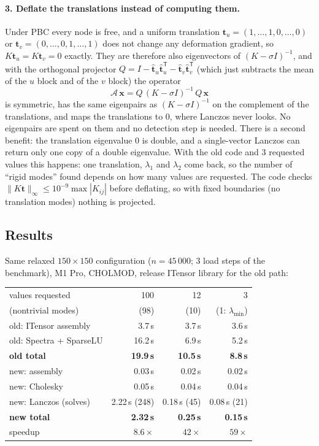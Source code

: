 \documentclass[11pt,a4paper]{article}
\theoremstyle{remark}
\newcommand{\T}{^{\mathsf T}}
\begin{document}
\paragraph{3. Deflate the translations instead of computing them.} Under PBC every node is free,
and a uniform translation $\bm t_u=(1,\dots,1,0,\dots,0)$ or $\bm t_v=(0,\dots,0,1,\dots,1)$ does
not change any deformation gradient, so $K\bm t_u=K\bm t_v=0$ exactly. They are therefore also
eigenvectors of $(K-\sigma I)^{-1}$, and with the orthogonal projector
$Q=I-\hat{\bm t}_u\hat{\bm t}_u\T-\hat{\bm t}_v\hat{\bm t}_v\T$ (which just subtracts the mean of
the $u$ block and of the $v$ block) the operator
\begin{equation}
\mathcal{A}\,\bm x = Q\,(K-\sigma I)^{-1}\,Q\,\bm x
\end{equation}
is symmetric, has the same eigenpairs as $(K-\sigma I)^{-1}$ on the complement of the
translations, and maps the translations to $0$, where Lanczos never looks. No eigenpairs are
spent on them and no detection step is needed. There is a second benefit: the translation
eigenvalue $0$ is double, and a single-vector Lanczos can return only one copy of a double
eigenvalue. With the old code and 3 requested values this happens: one translation, $\lambda_1$
and $\lambda_2$ come back, so the number of ``rigid modes'' found depends on how many values are
requested. The code checks $\|K\bm t\|_\infty\le10^{-9}\max|K_{ij}|$
before deflating, so with fixed boundaries (no translation modes) nothing is projected.

\subsection{Results}

Same relaxed $150\times150$ configuration ($n=45\,000$; 3 load steps of the benchmark), M1 Pro,
CHOLMOD, release ITensor library for the old path:

\begin{center}
\begin{tabular}{lrrr}
\toprule
values requested & 100 & 12 & 3\\
(nontrivial modes) & (98) & (10) & (1: $\lambda_{\min}$)\\
\midrule
old: ITensor assembly & 3.7\,s & 3.7\,s & 3.6\,s\\
old: Spectra + SparseLU & 16.2\,s & 6.9\,s & 5.2\,s\\
\textbf{old total} & \textbf{19.9\,s} & \textbf{10.5\,s} & \textbf{8.8\,s}\\
\midrule
new: assembly & 0.03\,s & 0.02\,s & 0.02\,s\\
new: Cholesky & 0.05\,s & 0.04\,s & 0.04\,s\\
new: Lanczos (solves) & 2.22\,s (248) & 0.18\,s (45) & 0.08\,s (21)\\
\textbf{new total} & \textbf{2.32\,s} & \textbf{0.25\,s} & \textbf{0.15\,s}\\
\midrule
speedup & $8.6\times$ & $42\times$ & $59\times$\\
\bottomrule
\end{tabular}
\end{center}
\end{document}
